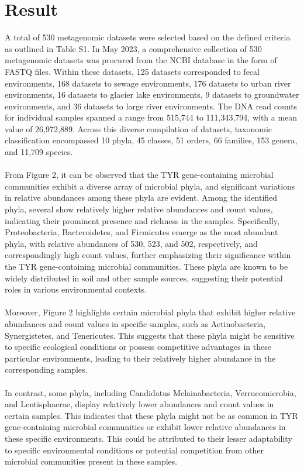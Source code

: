 \documentclass[12pt]{article}
\begin{document}
\section{Result}
A total of 530 metagenomic datasets were selected based on the defined criteria as outlined in Table S1. In May 2023, a comprehensive collection of 530 metagenomic datasets was procured from the NCBI database in the form of FASTQ files. Within these datasets, 125 datasets corresponded to fecal environments, 168 datasets to sewage environments, 176 datasets to urban river environments, 16 datasets to glacier lake environments, 9 datasets to groundwater environments, and 36 datasets to large river environments. The DNA read counts for individual samples spanned a range from 515,744 to 111,343,794, with a mean value of 26,972,889. Across this diverse compilation of datasets, taxonomic classification encompassed 10 phyla, 45 classes, 51 orders, 66 families, 153 genera, and 11,709 species.\\\\
From Figure 2, it can be observed that the TYR gene-containing microbial communities exhibit a diverse array of microbial phyla, and significant variations in relative abundances among these phyla are evident. Among the identified phyla, several show relatively higher relative abundances and count values, indicating their prominent presence and richness in the samples. Specifically, Proteobacteria, Bacteroidetes, and Firmicutes emerge as the most abundant phyla, with relative abundances of 530, 523, and 502, respectively, and correspondingly high count values, further emphasizing their significance within the TYR gene-containing microbial communities. These phyla are known to be widely distributed in soil and other sample sources, suggesting their potential roles in various environmental contexts.\\\\
Moreover, Figure 2 highlights certain microbial phyla that exhibit higher relative abundances and count values in specific samples, such as Actinobacteria, Synergistetes, and Tenericutes. This suggests that these phyla might be sensitive to specific ecological conditions or possess competitive advantages in these particular environments, leading to their relatively higher abundance in the corresponding samples.\\\\
In contrast, some phyla, including Candidatus Melainabacteria, Verrucomicrobia, and Lentisphaerae, display relatively lower abundances and count values in certain samples. This indicates that these phyla might not be as common in TYR gene-containing microbial communities or exhibit lower relative abundances in these specific environments. This could be attributed to their lesser adaptability to specific environmental conditions or potential competition from other microbial communities present in these samples.
\end{document}

